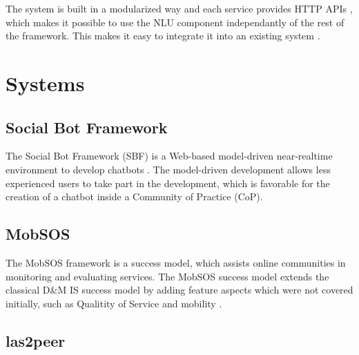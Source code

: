 The system is built in a modularized way and each service provides HTTP APIs \cite{BFPN17}, which makes it possible to use the NLU component independantly of the rest of the framework. This makes it easy to integrate it into an existing system \cite{RaKe19}.

\section{Systems} \label{lab:systems}

\subsection{Social Bot Framework}

The Social Bot Framework (SBF) is a Web-based model-driven near-realtime environment to develop chatbots \cite{NLKl19}. The model-driven development allows less experienced users to take part in the development, which is favorable for the creation of a chatbot inside a Community of Practice (CoP).

\subsection{MobSOS}
The MobSOS framework is a success model, which assists online communities in monitoring and evaluating services. The MobSOS success model extends the classical D\&M IS success model by adding feature aspects which were not covered initially, such as Qualitity of Service and mobility \cite{Renz08}.

\subsection{las2peer}
